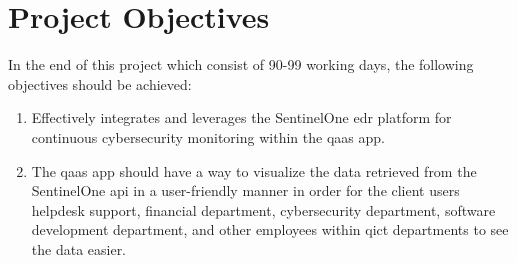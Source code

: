 \section{Project Objectives}
In the end of this project which consist of 90-99 working days, the following objectives should be achieved:
\begin{enumerate}
      \item Effectively integrates and leverages the SentinelOne \acrshort{edr} platform for continuous
            cybersecurity monitoring within the \acrshort{qaas} app.
      \item The \acrshort{qaas} app should have a way to visualize the data retrieved from the SentinelOne
            \acrshort{api} in a user-friendly manner in order for the client users helpdesk support, financial
            department, cybersecurity department, software development department, and other employees within
            \acrshort{qict}  departments to see the data easier.
\end{enumerate}
